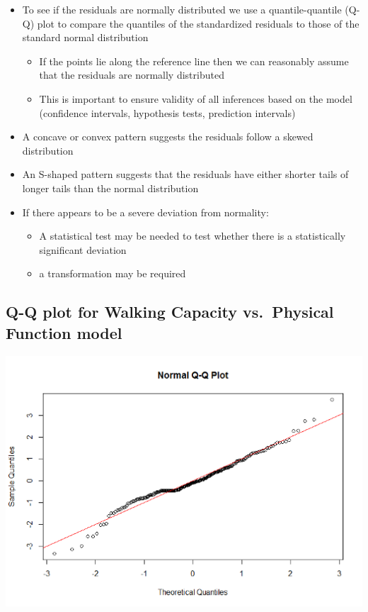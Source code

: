 \documentclass[
]{book}
\providecommand{\tightlist}{%
  \setlength{\itemsep}{0pt}\setlength{\parskip}{0pt}}
\begin{document}
\begin{itemize}
\tightlist
\item
  To see if the residuals are normally distributed we use a quantile-quantile (Q-Q) plot to compare the quantiles of the standardized residuals to those of the standard normal distribution

  \begin{itemize}
  \tightlist
  \item
    If the points lie along the reference line then we can reasonably assume that the residuals are normally distributed
  \item
    This is important to ensure validity of all inferences based on the model (confidence intervals, hypothesis tests, prediction intervals)
  \end{itemize}
\item
  A concave or convex pattern suggests the residuals follow a skewed distribution
\item
  An S-shaped pattern suggests that the residuals have either shorter tails of longer tails than the normal distribution
\item
  If there appears to be a severe deviation from normality:

  \begin{itemize}
  \tightlist
  \item
    A statistical test may be needed to test whether there is a statistically significant deviation
  \item
    a transformation may be required
  \end{itemize}
\end{itemize}

\hypertarget{q-q-plot-for-walking-capacity-vs.-physical-function-model}{%
\subsection{Q-Q plot for Walking Capacity vs.~Physical Function model}\label{q-q-plot-for-walking-capacity-vs.-physical-function-model}}

\includegraphics[width=1\linewidth]{./12_51}
\end{document}

